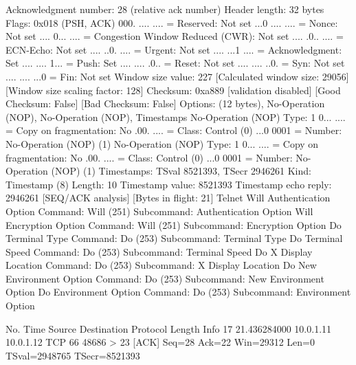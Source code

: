     Acknowledgment number: 28    (relative ack number)
    Header length: 32 bytes
    Flags: 0x018 (PSH, ACK)
        000. .... .... = Reserved: Not set
        ...0 .... .... = Nonce: Not set
        .... 0... .... = Congestion Window Reduced (CWR): Not set
        .... .0.. .... = ECN-Echo: Not set
        .... ..0. .... = Urgent: Not set
        .... ...1 .... = Acknowledgment: Set
        .... .... 1... = Push: Set
        .... .... .0.. = Reset: Not set
        .... .... ..0. = Syn: Not set
        .... .... ...0 = Fin: Not set
    Window size value: 227
    [Calculated window size: 29056]
    [Window size scaling factor: 128]
    Checksum: 0xa889 [validation disabled]
        [Good Checksum: False]
        [Bad Checksum: False]
    Options: (12 bytes), No-Operation (NOP), No-Operation (NOP), Timestamps
        No-Operation (NOP)
            Type: 1
                0... .... = Copy on fragmentation: No
                .00. .... = Class: Control (0)
                ...0 0001 = Number: No-Operation (NOP) (1)
        No-Operation (NOP)
            Type: 1
                0... .... = Copy on fragmentation: No
                .00. .... = Class: Control (0)
                ...0 0001 = Number: No-Operation (NOP) (1)
        Timestamps: TSval 8521393, TSecr 2946261
            Kind: Timestamp (8)
            Length: 10
            Timestamp value: 8521393
            Timestamp echo reply: 2946261
    [SEQ/ACK analysis]
        [Bytes in flight: 21]
Telnet
    Will Authentication Option
        Command: Will (251)
        Subcommand: Authentication Option
    Will Encryption Option
        Command: Will (251)
        Subcommand: Encryption Option
    Do Terminal Type
        Command: Do (253)
        Subcommand: Terminal Type
    Do Terminal Speed
        Command: Do (253)
        Subcommand: Terminal Speed
    Do X Display Location
        Command: Do (253)
        Subcommand: X Display Location
    Do New Environment Option
        Command: Do (253)
        Subcommand: New Environment Option
    Do Environment Option
        Command: Do (253)
        Subcommand: Environment Option

No.     Time           Source                Destination           Protocol Length Info
     17 21.436284000   10.0.1.11             10.0.1.12             TCP      66     48686 > 23 [ACK] Seq=28 Ack=22 Win=29312 Len=0 TSval=2948765 TSecr=8521393

